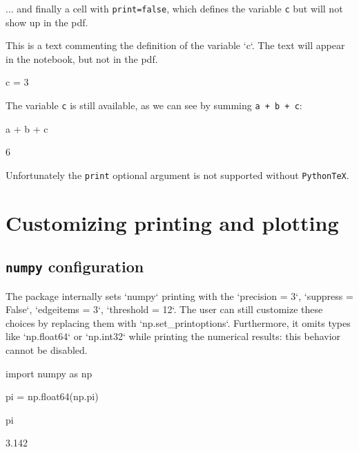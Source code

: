 \documentclass[oneside]{book}
\begin{document}
... and finally a cell with \texttt{print=false}, which defines the variable \texttt{c} but will not show up in the pdf.

\ifPythonTeXLoaded
\begin{mdcell}[print=false]
This is a text commenting the definition of the variable `c`. The text will appear in the notebook, but not in the pdf.
\end{mdcell}
\begin{pycell}[print=false]
c = 3
\end{pycell}
\else
\fi

The variable \texttt{c} is still available, as we can see by summing \texttt{a + b + c}:
\begin{pycell}
a + b + c
\end{pycell}
\begin{pyexpectedoutput}
6
\end{pyexpectedoutput}

Unfortunately the \texttt{print} optional argument is not supported without \texttt{PythonTeX}.

\chapter{Customizing printing and plotting}

\section{\texttt{numpy} configuration}

\begin{mdcell}
The package internally sets `numpy` printing with the `precision = 3`, `suppress = False`, `edgeitems = 3`, `threshold = 12`. The user can still customize these choices by replacing them with `np.set_printoptions`. Furthermore, it omits types like `np.float64` or `np.int32` while printing the numerical results: this behavior cannot be disabled.
\end{mdcell}

\begin{pycell}
import numpy as np

pi = np.float64(np.pi)
\end{pycell}

\begin{pycell}
pi
\end{pycell}

\begin{pyexpectedoutput}
3.142
\end{pyexpectedoutput}
\end{document}
